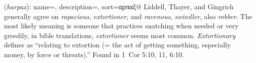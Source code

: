 \item[Extortionary,]

(\textit{harpax}):
{
    name=,
    description={},
    sort=αρπαξ@
}
Liddell, Thayer, and Gingrich generally agree on \emph{rapacious}, \emph{extortioner}, and \emph{ravenous}, \emph{swindler}, also \emph{robber}. The most likely meaning is someone that practices snatching when needed or very greedily, in bible translations, \emph{extortioner} seems most common. \emph{Extortionary} defines as ``relating to extortion (= the act of getting something, especially money, by force or threats).''
Found in 1~Cor 5:10, 11, 6:10.
